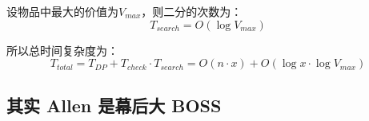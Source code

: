 \documentclass[../mainReport.tex]{subfiles}
\begin{document}
设物品中最大的价值为$V_{max}$，则二分的次数为：
\[
    T_{search}=O(\log V_{max})
\]

所以总时间复杂度为：
\[
    T_{total}=T_{DP} + T_{check}\cdot T_{search}=O(n\cdot x) + O(\log x\cdot\log V_{max})
\]





    
    
    
    
    
        
        

\subsection{其实 Allen 是幕后大 BOSS}
\end{document}
